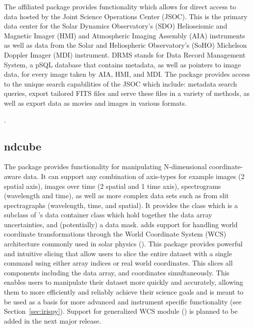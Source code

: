 The  affiliated package provides functionality which allows for direct access to data hosted by the Joint Science Operations Center (JSOC).
This is the primary data center for the Solar Dynamics Observatory’s (SDO) Helioseismic and Magnetic Imager (HMI) and Atmospheric Imaging Assembly (AIA) instruments as well as data from the Solar and Heliospheric Observatory's (SoHO) Michelson Doppler Imager (MDI) instrument.
DRMS stands for Data Record Management System, a pSQL database that contains metadata, as well as pointers to image data, for every image taken by AIA, HMI, and MDI.
The  package provides access to the unique search capabilities of the JSOC which include: metadata search queries, export tailored FITS files and serve these files in a variety of methods, as well as export data as movies and images in various formats.

.

\subsection{ndcube}
\label{sec:ndcube}

The  package provides functionality for manipulating N-dimensional coordinate-aware data.
It can support any combination of axis-types for example
images (2 spatial axis), images over time (2 spatial and 1 time axis), spectrograms
(wavelength and time), as well as more complex data sets such as from slit spectragraphs (wavelength, time, and spatial).
It provides the class  which is a subclass of \astropy's  data container class which hold together the data array uncertainties, and (potentially) a data mask.
 adds support for handling world coordinate transformations through the World Coordinate System (WCS) architecture commonly used in solar physics ().
This package provides powerful and intuitive slicing that allow users to slice the entire dataset with a single command using either array indices or real world coordinates.
This slices all components including the data array, and coordinates simultaneously.
This enables users to manipulate their dataset more quickly and accurately, allowing them to more efficiently and reliably achieve their science goals and is meant to be used as a basis for more advanced and instrument specific functionality (see Section~\ref{sec:irispy}).
Support for generalized WCS module () is planned to be added in the next major release.

